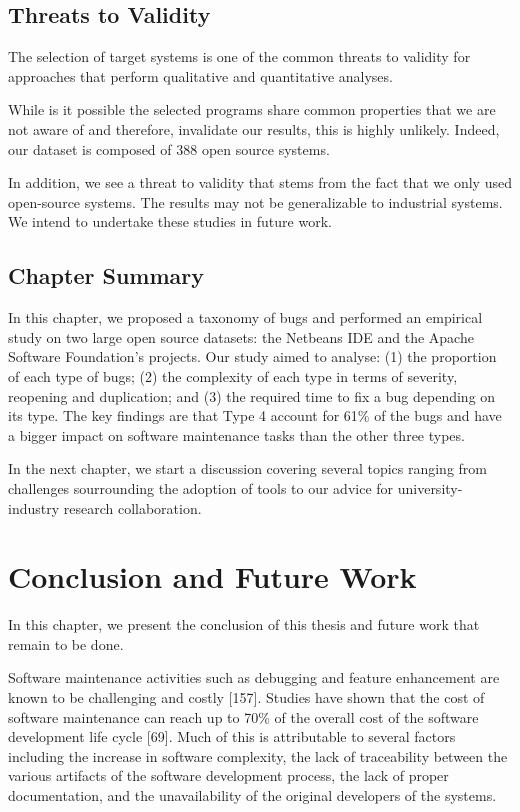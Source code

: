 \documentclass[12pt]{report}
\begin{document}
\section{Threats to Validity}\label{threats-to-validity-5}

The selection of target systems is one of the common threats to validity
for approaches that perform qualitative and quantitative analyses.

While is it possible the selected programs share common properties that
we are not aware of and therefore, invalidate our results, this is
highly unlikely. Indeed, our dataset is composed of 388 open source
systems.

In addition, we see a threat to validity that stems from the fact that
we only used open-source systems. The results may not be generalizable
to industrial systems. We intend to undertake these studies in future
work.

\section{Chapter Summary}\label{chapter-summary-5}

In this chapter, we proposed a taxonomy of bugs and performed an
empirical study on two large open source datasets: the Netbeans IDE and
the Apache Software Foundation's projects. Our study aimed to analyse:
(1) the proportion of each type of bugs; (2) the complexity of each type
in terms of severity, reopening and duplication; and (3) the required
time to fix a bug depending on its type. The key findings are that Type
4 account for 61\% of the bugs and have a bigger impact on software
maintenance tasks than the other three types.

In the next chapter, we start a discussion covering several topics
ranging from challenges sourrounding the adoption of tools to our advice
for university-industry research collaboration.

\chapter{Conclusion and Future Work}\label{conclusion-and-future-work}

In this chapter, we present the conclusion of this thesis and future
work that remain to be done.

Software maintenance activities such as debugging and feature
enhancement are known to be challenging and costly {[}157{]}. Studies
have shown that the cost of software maintenance can reach up to 70\% of
the overall cost of the software development life cycle {[}69{]}. Much
of this is attributable to several factors including the increase in
software complexity, the lack of traceability between the various
artifacts of the software development process, the lack of proper
documentation, and the unavailability of the original developers of the
systems.
\end{document}
